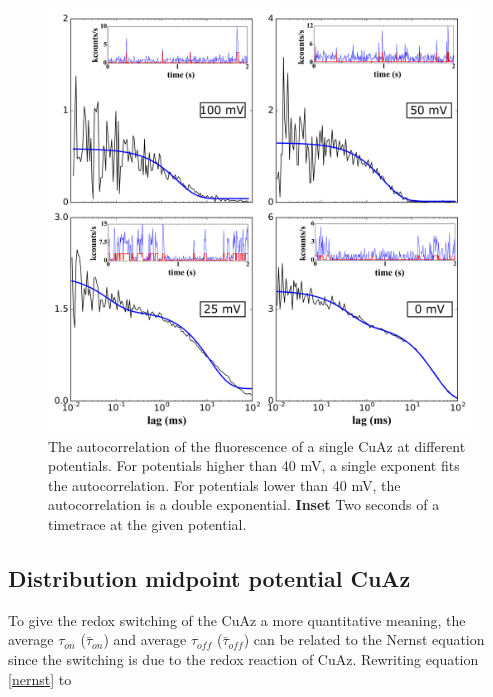 \documentclass[twoside,single]{lion-msc}
\begin{document}
\begin{figure}[ht!]
\centering
\includegraphics[width=\textwidth]{plots_AC_diff_pot}
\caption{The autocorrelation of the fluorescence of a single CuAz at different potentials. For potentials higher than 40 mV, a single exponent fits the autocorrelation. For potentials lower than 40 mV, the autocorrelation is a double exponential. \textbf{Inset} Two seconds of a timetrace at the given potential.}
\label{autowcorrelasie}
\end{figure}


\subsection{Distribution midpoint potential CuAz}
To give the redox switching of the CuAz a more quantitative meaning, the average $\tau_{on}$ ($\bar{\tau}_{on}$) and average $\tau_{off}$ ($\bar{\tau}_{off}$) can be related to the Nernst equation since the switching is due to the redox reaction of CuAz. Rewriting equation \ref{nernst} to 
\end{document}
